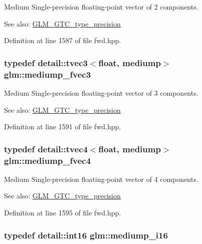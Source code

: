 Medium Single-precision floating-point vector of 2 components. \begin{Desc}
\item[See also:]\hyperlink{group__gtc__type__precision}{GLM\_\-GTC\_\-type\_\-precision} \end{Desc}


Definition at line 1587 of file fwd.hpp.\hypertarget{group__gtc__type__precision_g710c3af5ebb05e5e863cff78affd25a6}{
\subsubsection[mediump\_\-fvec3]{\setlength{\rightskip}{0pt plus 5cm}typedef detail::tvec3$<$float, mediump$>$ {\bf glm::mediump\_\-fvec3}}}
\label{group__gtc__type__precision_g710c3af5ebb05e5e863cff78affd25a6}


Medium Single-precision floating-point vector of 3 components. \begin{Desc}
\item[See also:]\hyperlink{group__gtc__type__precision}{GLM\_\-GTC\_\-type\_\-precision} \end{Desc}


Definition at line 1591 of file fwd.hpp.\hypertarget{group__gtc__type__precision_gba16de142de00531a1598d83716c6939}{
\subsubsection[mediump\_\-fvec4]{\setlength{\rightskip}{0pt plus 5cm}typedef detail::tvec4$<$float, mediump$>$ {\bf glm::mediump\_\-fvec4}}}
\label{group__gtc__type__precision_gba16de142de00531a1598d83716c6939}


Medium Single-precision floating-point vector of 4 components. \begin{Desc}
\item[See also:]\hyperlink{group__gtc__type__precision}{GLM\_\-GTC\_\-type\_\-precision} \end{Desc}


Definition at line 1595 of file fwd.hpp.\hypertarget{group__gtc__type__precision_g8454fc6a82c7bb787d0ac9663e08f63d}{
\subsubsection[mediump\_\-i16]{\setlength{\rightskip}{0pt plus 5cm}typedef detail::int16 {\bf glm::mediump\_\-i16}}}
\label{group__gtc__type__precision_g8454fc6a82c7bb787d0ac9663e08f63d}



